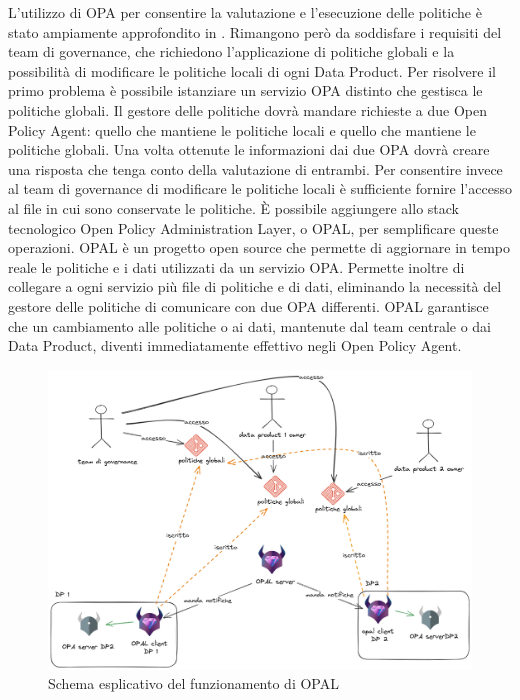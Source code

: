 \documentclass[12pt]{report}
\begin{document}
L'utilizzo di OPA per consentire la valutazione e l'esecuzione delle politiche è stato ampiamente approfondito in \cite{caronni2022framework}.
Rimangono però da soddisfare i requisiti del team di governance, che richiedono l'applicazione di politiche globali e la possibilità di modificare le politiche locali di ogni Data Product.
Per risolvere il primo problema è possibile istanziare un servizio OPA distinto che gestisca le politiche globali.
Il gestore delle politiche dovrà mandare richieste a due Open Policy Agent: quello che mantiene le politiche locali e quello che mantiene le politiche globali.
Una volta ottenute le informazioni dai due OPA dovrà creare una risposta che tenga conto della valutazione di entrambi.
Per consentire invece al team di governance di modificare le politiche locali è sufficiente fornire l'accesso al file in cui sono conservate le politiche.
È possibile aggiungere allo stack tecnologico Open Policy Administration Layer, o OPAL, per semplificare queste operazioni.
OPAL è un progetto open source che permette di aggiornare in tempo reale le politiche e i dati utilizzati da un servizio OPA.
Permette inoltre di collegare a ogni servizio più file di politiche e di dati, eliminando la necessità del gestore delle politiche di comunicare con due OPA differenti.
OPAL garantisce che un cambiamento alle politiche o ai dati, mantenute dal team centrale o dai Data Product, diventi immediatamente effettivo negli Open Policy Agent.
\begin{figure}[H]
    \centering
    \includegraphics[width=\linewidth]{immagini/OPAL funzionamento.png}
    \caption{Schema esplicativo del funzionamento di OPAL}
    \label{funzionamento_OPAL}
\end{figure}
\end{document}
